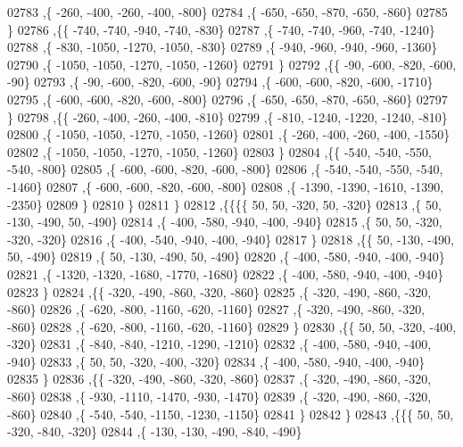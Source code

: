 \begin{DoxyCode}
02783     ,\{  -260,  -400,  -260,  -400,  -800\}
02784     ,\{  -650,  -650,  -870,  -650,  -860\}
02785     \}
02786    ,\{\{  -740,  -740,  -940,  -740,  -830\}
02787     ,\{  -740,  -740,  -960,  -740, -1240\}
02788     ,\{  -830, -1050, -1270, -1050,  -830\}
02789     ,\{  -940,  -960,  -940,  -960, -1360\}
02790     ,\{ -1050, -1050, -1270, -1050, -1260\}
02791     \}
02792    ,\{\{   -90,  -600,  -820,  -600,   -90\}
02793     ,\{   -90,  -600,  -820,  -600,   -90\}
02794     ,\{  -600,  -600,  -820,  -600, -1710\}
02795     ,\{  -600,  -600,  -820,  -600,  -800\}
02796     ,\{  -650,  -650,  -870,  -650,  -860\}
02797     \}
02798    ,\{\{  -260,  -400,  -260,  -400,  -810\}
02799     ,\{  -810, -1240, -1220, -1240,  -810\}
02800     ,\{ -1050, -1050, -1270, -1050, -1260\}
02801     ,\{  -260,  -400,  -260,  -400, -1550\}
02802     ,\{ -1050, -1050, -1270, -1050, -1260\}
02803     \}
02804    ,\{\{  -540,  -540,  -550,  -540,  -800\}
02805     ,\{  -600,  -600,  -820,  -600,  -800\}
02806     ,\{  -540,  -540,  -550,  -540, -1460\}
02807     ,\{  -600,  -600,  -820,  -600,  -800\}
02808     ,\{ -1390, -1390, -1610, -1390, -2350\}
02809     \}
02810    \}
02811   \}
02812  ,\{\{\{\{    50,    50,  -320,    50,  -320\}
02813     ,\{    50,  -130,  -490,    50,  -490\}
02814     ,\{  -400,  -580,  -940,  -400,  -940\}
02815     ,\{    50,    50,  -320,  -320,  -320\}
02816     ,\{  -400,  -540,  -940,  -400,  -940\}
02817     \}
02818    ,\{\{    50,  -130,  -490,    50,  -490\}
02819     ,\{    50,  -130,  -490,    50,  -490\}
02820     ,\{  -400,  -580,  -940,  -400,  -940\}
02821     ,\{ -1320, -1320, -1680, -1770, -1680\}
02822     ,\{  -400,  -580,  -940,  -400,  -940\}
02823     \}
02824    ,\{\{  -320,  -490,  -860,  -320,  -860\}
02825     ,\{  -320,  -490,  -860,  -320,  -860\}
02826     ,\{  -620,  -800, -1160,  -620, -1160\}
02827     ,\{  -320,  -490,  -860,  -320,  -860\}
02828     ,\{  -620,  -800, -1160,  -620, -1160\}
02829     \}
02830    ,\{\{    50,    50,  -320,  -400,  -320\}
02831     ,\{  -840,  -840, -1210, -1290, -1210\}
02832     ,\{  -400,  -580,  -940,  -400,  -940\}
02833     ,\{    50,    50,  -320,  -400,  -320\}
02834     ,\{  -400,  -580,  -940,  -400,  -940\}
02835     \}
02836    ,\{\{  -320,  -490,  -860,  -320,  -860\}
02837     ,\{  -320,  -490,  -860,  -320,  -860\}
02838     ,\{  -930, -1110, -1470,  -930, -1470\}
02839     ,\{  -320,  -490,  -860,  -320,  -860\}
02840     ,\{  -540,  -540, -1150, -1230, -1150\}
02841     \}
02842    \}
02843   ,\{\{\{    50,    50,  -320,  -840,  -320\}
02844     ,\{  -130,  -130,  -490,  -840,  -490\}

\end{DoxyCode}
